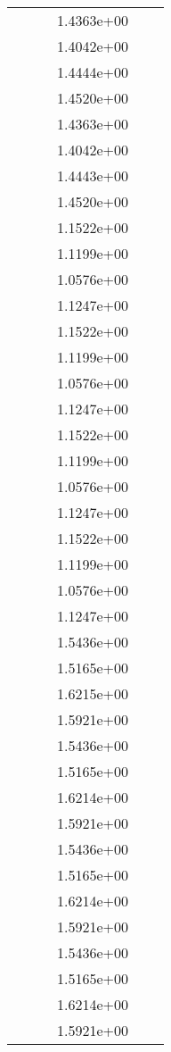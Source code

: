\begin{xltabular}{\textwidth}{r|rS[table-format=1.3e+2]S[table-format=1.4e+2]S[table-format=1.4e+2]S[table-format=-1.5]}
&  &  & 1.4363e+00 & & \\
&  &  & 1.4042e+00 & & \\
&  &  & 1.4444e+00 & & \\
&  &  & 1.4520e+00 & & \\
&  &  & 1.4363e+00 & & \\
&  &  & 1.4042e+00 & & \\
&  &  & 1.4443e+00 & & \\
&  &  & 1.4520e+00 & & \\
&  &  & 1.1522e+00 & & \\
&  &  & 1.1199e+00 & & \\
&  &  & 1.0576e+00 & & \\
&  &  & 1.1247e+00 & & \\
&  &  & 1.1522e+00 & & \\
&  &  & 1.1199e+00 & & \\
&  &  & 1.0576e+00 & & \\
&  &  & 1.1247e+00 & & \\
&  &  & 1.1522e+00 & & \\
&  &  & 1.1199e+00 & & \\
&  &  & 1.0576e+00 & & \\
&  &  & 1.1247e+00 & & \\
&  &  & 1.1522e+00 & & \\
&  &  & 1.1199e+00 & & \\
&  &  & 1.0576e+00 & & \\
&  &  & 1.1247e+00 & & \\
&  &  & 1.5436e+00 & & \\
&  &  & 1.5165e+00 & & \\
&  &  & 1.6215e+00 & & \\
&  &  & 1.5921e+00 & & \\
&  &  & 1.5436e+00 & & \\
&  &  & 1.5165e+00 & & \\
&  &  & 1.6214e+00 & & \\
&  &  & 1.5921e+00 & & \\
&  &  & 1.5436e+00 & & \\
&  &  & 1.5165e+00 & & \\
&  &  & 1.6214e+00 & & \\
&  &  & 1.5921e+00 & & \\
&  &  & 1.5436e+00 & & \\
&  &  & 1.5165e+00 & & \\
&  &  & 1.6214e+00 & & \\
&  &  & 1.5921e+00 & & \\

\end{xltabular}
